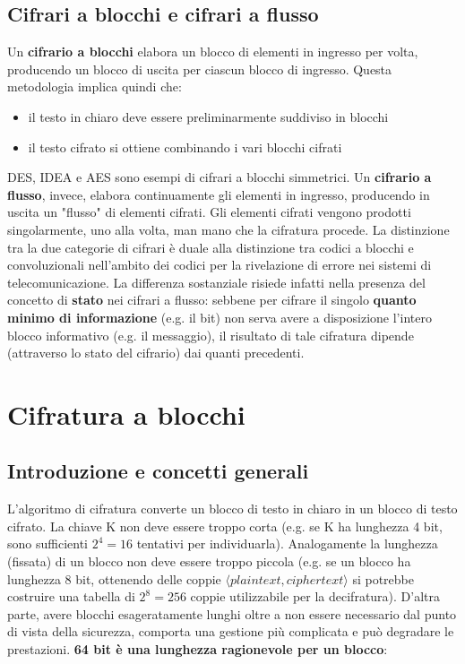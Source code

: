 \subsection{Cifrari a blocchi e cifrari a flusso}
Un \textbf{cifrario a blocchi} elabora un blocco di elementi in ingresso per volta, producendo un blocco di uscita per ciascun blocco di ingresso. Questa metodologia implica quindi che:
\begin{itemize}
  \item il testo in chiaro deve essere preliminarmente suddiviso in blocchi
  \item il testo cifrato si ottiene combinando i vari blocchi cifrati
\end{itemize}
DES, IDEA e AES sono esempi di cifrari a blocchi simmetrici. Un \textbf{cifrario a flusso}, invece, elabora continuamente gli elementi in ingresso, producendo in uscita un "flusso" di elementi cifrati. Gli elementi cifrati vengono prodotti singolarmente, uno alla volta, man mano che la cifratura procede. La distinzione tra la due categorie di cifrari è duale alla distinzione tra codici a blocchi e convoluzionali nell'ambito dei codici per la rivelazione di errore nei sistemi di telecomunicazione. La differenza sostanziale risiede infatti nella presenza del concetto di \textbf{stato} nei cifrari a flusso: sebbene per cifrare il singolo \textbf{quanto minimo di informazione} (e.g. il bit) non serva avere a disposizione l'intero blocco informativo (e.g. il messaggio), il risultato di tale cifratura dipende (attraverso lo stato del cifrario) dai quanti precedenti.

\section{Cifratura a blocchi}

\subsection{Introduzione e concetti generali}
L'algoritmo di cifratura converte un blocco di testo in chiaro in un blocco di testo cifrato. La chiave K non deve essere troppo corta (e.g. se K ha lunghezza 4 bit, sono sufficienti $2^4 = 16$ tentativi per individuarla). Analogamente la lunghezza (fissata) di un blocco non deve essere troppo piccola (e.g. se un blocco ha lunghezza 8 bit, ottenendo delle coppie $\langle plaintext, ciphertext \rangle$ si potrebbe costruire una tabella di $2^8 = 256$ coppie utilizzabile per la decifratura).\newline 
D'altra parte, avere blocchi esageratamente lunghi oltre a non essere necessario dal punto di vista della sicurezza, comporta una gestione più complicata e può degradare le prestazioni. \textbf{64 bit è una lunghezza ragionevole per un blocco}: 

